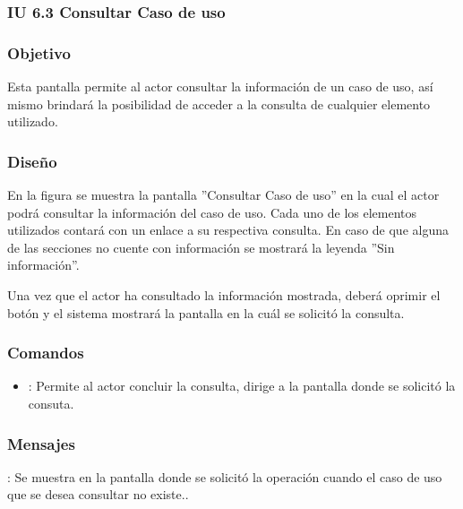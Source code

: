 \subsubsection{IU 6.3 Consultar Caso de uso}

\subsubsection{Objetivo}
	Esta pantalla permite al actor consultar la información de un caso de uso, así mismo brindará la posibilidad de acceder a la consulta de cualquier elemento utilizado.
\subsubsection{Diseño}
	En la figura  se muestra la pantalla ''Consultar Caso de uso'' en la cual el actor podrá consultar la información del caso de uso. Cada uno de los elementos utilizados contará con un enlace a su respectiva consulta. En caso de que alguna de las secciones no cuente con información se mostrará la leyenda ''Sin información''.

Una vez que el actor ha consultado la información mostrada, deberá oprimir el botón  y el sistema mostrará la pantalla en la cuál se solicitó la consulta.

\subsubsection{Comandos}
\begin{itemize}
	\item {}: Permite al actor concluir la consulta, dirige a la pantalla donde se solicitó la consuta.
\end{itemize}

\subsubsection{Mensajes}

\begin{Citemize}
	\item {}: Se muestra en la pantalla donde se solicitó la operación cuando el caso de uso que se desea consultar no existe..
\end{Citemize}
